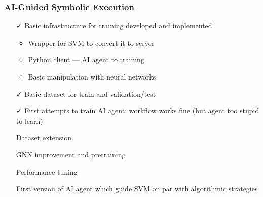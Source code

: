 \documentclass[xcolor=table,aspectratio=169]{beamer}
\begin{document}
\begin{frame}[fragile]
  \frametitle{AI-Guided Symbolic Execution}  
  
  \begin{itemize}
    \item[\faCheck] Basic infrastructure for training developed and implemented
      \begin{itemize}
        \item Wrapper for SVM to convert it to server
        \item Python client --- AI agent to training
        \item Basic manipulation with neural networks 
      \end{itemize}
    \item[\faCheck] Basic dataset for train and validation/test
    \item[\faCheck] First attempts to train AI agent: workflow works fine (but agent too stupid to learn) 
    \item[\faGears] Dataset extension
    \item[\faGears] GNN improvement and pretraining 
    \item[\faGears] Performance tuning 
    \item[\faHourglassHalf] First version of AI agent which guide SVM on par with algorithmic strategies
  \end{itemize}
\end{frame}
\end{document}
